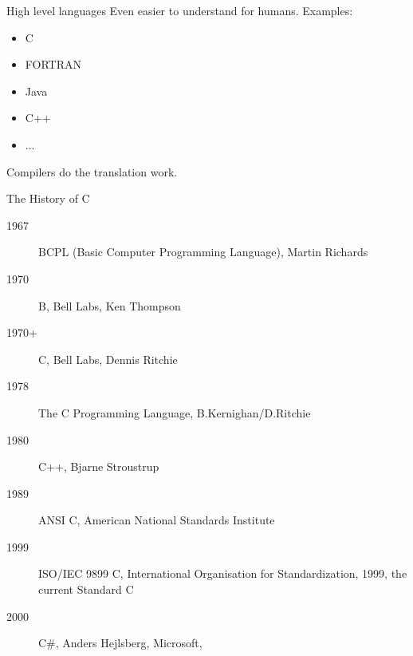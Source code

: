 \begin{frame}
  \begin{block}{High level languages}
    Even easier to understand for humans. Examples:
    \begin{itemize}
    \item C
    \item FORTRAN
    \item Java
    \item C++
    \item ...
    \end{itemize}\pause
    \alert{Compilers} do the translation work.    
  \end{block}
\end{frame}

\begin{frame}{The History of C}
  \begin{description}
  \item[1967] \alert{BCPL} (Basic Computer Programming Language), Martin Richards
  \item[1970] \alert{B}, Bell Labs, Ken Thompson
  \item[1970+] \alert{C}, Bell Labs, Dennis Ritchie
  \item[1978] \alert{The C Programming Language}, B.Kernighan/D.Ritchie
  \item[1980] \alert{C++}, Bjarne Stroustrup
  \item[1989] \alert{ANSI C}, American National Standards Institute
  \item[1999] \alert{ISO/IEC 9899 C}, International Organisation for Standardization, 1999, the
    current Standard C
  \item[2000] \alert{C\#}, Anders Hejlsberg, Microsoft, 
  \end{description}
\end{frame}


